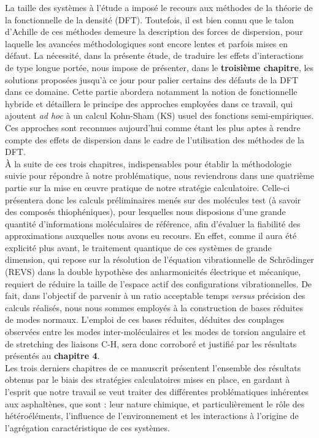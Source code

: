 	La taille des systèmes à l'étude a imposé le recours aux méthodes de la théorie de la fonctionnelle de la densité (DFT). Toutefois, il est bien connu que le talon d'Achille de ces méthodes demeure la description des forces de dispersion, pour laquelle les avancées méthodologiques sont encore lentes et parfois mises en défaut. La nécessité, dans la présente étude, de traduire les effets d'interactions de type longue portée, nous impose de présenter, dans le \textbf{troisième chapitre}, les solutions proposées jusqu'à ce jour pour palier certains des défauts de la DFT dans ce domaine. Cette partie abordera notamment la notion de fonctionnelle hybride et détaillera le principe des approches employées dans ce travail, qui ajoutent \textit{ad hoc} à un calcul Kohn-Sham (KS) usuel des fonctions semi-empiriques. Ces approches sont reconnues aujourd'hui comme étant les plus aptes à rendre compte des effets de dispersion dans le cadre de l'utilisation des méthodes de la DFT. \\
	
	À la suite de ces trois chapitres, indispensables pour établir la méthodologie suivie pour répondre à notre problématique, nous reviendrons dans une quatrième partie sur la mise en œuvre pratique de notre stratégie calculatoire. Celle-ci présentera donc les calculs préliminaires menés sur des molécules test (à savoir des composés thiophéniques), pour lesquelles nous disposions d'une grande quantité d'informations moléculaires de référence, afin d'évaluer la fiabilité des approximations auxquelles nous avons eu recours. En effet, comme il aura été explicité plus avant, le traitement quantique de ces systèmes de grande dimension, qui repose sur la résolution de l'équation vibrationnelle de Schrödinger (REVS) dans la double hypothèse des anharmonicités électrique et mécanique, requiert de réduire la taille de l'espace actif des configurations vibrationnelles. De fait, dans l'objectif de parvenir à un ratio acceptable temps \textit{versus} précision des calculs réalisés, nous nous sommes employés à la construction de bases réduites de modes normaux. L'emploi de ces bases réduites, déduites des couplages observées entre les modes inter-moléculaires et les modes de torsion angulaire et de stretching des liaisons C-H, sera donc corroboré et justifié par les résultats présentés au \textbf{chapitre 4}.  \\
	
	Les trois derniers chapitres de ce manuscrit présentent l'ensemble des résultats obtenus par le biais des stratégies calculatoires mises en place, en gardant à l'esprit que notre travail se veut traiter des différentes problématiques inhérentes aux asphaltènes, que sont : leur nature chimique, et particulièrement le rôle des hétéroéléments, l'influence de l'environnement et les interactions à l'origine de l'agrégation caractéristique de ces systèmes.\\ 
	
